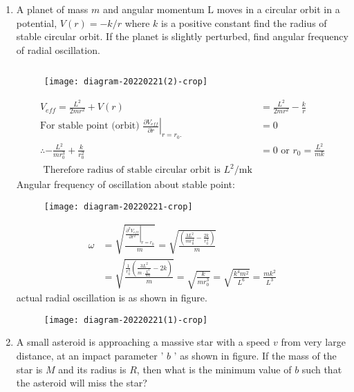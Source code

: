 \begin{enumerate}
	\item  A planet of mass $m$ and angular momentum $\mathrm{L}$ moves in a circular orbit in a potential, $V(r)=-k / r$ where $k$ is a positive constant find the radius of stable circular orbit. If the planet is slightly perturbed, find angular frequency of radial oscillation.
	\begin{answer}$\left. \right. $
		\begin{figure}[H]
			\centering
			\texttt{[image: diagram-20220221(2)-crop]}
		\end{figure}
		\begin{align*}
		V_{e f f}=\frac{L^{2}}{2 m r^{2}}+V(r)&=\frac{L^{2}}{2 m r^{2}}-\frac{k}{r}\\
		\text{For stable point (orbit) }\left.\frac{\partial V_{e f f}}{\partial r}\right|_{r=r_{0} .}&=0\\
		\therefore-\frac{L^{2}}{m r_{0}^{3}}+\frac{k}{r_{0}^{2}}&=0 \text { or } r_{0}=\frac{L^{2}}{m k}\\
		\text{	Therefore radius of stable circular orbit is }L^{2} / \mathrm{mk}
		\end{align*}
		Angular frequency of oscillation about stable point:
		\begin{figure}[H]
			\centering
			\texttt{[image: diagram-20220221-crop]}
		\end{figure}
		\begin{align*}
		\omega&=\sqrt{\frac{\left.\frac{\partial^{2} V_{e f f}}{\partial r^{2}}\right|_{r=r_{0}}}{m}}=\sqrt{\frac{\left(\frac{3 L^{2}}{m r_{0}^{4}}-\frac{2 k}{r_{0}^{3}}\right)}{m}}\\
		&=\sqrt{\frac{\frac{1}{r_{0}^{3}}\left(\frac{3 L^{2}}{m \cdot \frac{L^{2}}{m k}}-2 k\right)}{m}}=\sqrt{\frac{k}{m r_{0}^{3}}}=\sqrt{\frac{k^{4} m^{2}}{L^{6}}}=\frac{m k^{2}}{L^{3}}
		\end{align*}
		actual radial oscillation is as shown in figure.
		\begin{figure}[H]
			\centering
			\texttt{[image: diagram-20220221(1)-crop]}
		\end{figure}
	\end{answer}
	\item  A small asteroid is approaching a massive star with a speed $v$ from very large distance, at an impact parameter ' $b$ ' as shown in figure. If the mass of the star is $M$ and its radius is $R$, then what is the minimum value of $b$ such that the asteroid will miss the star?

\end{enumerate}
